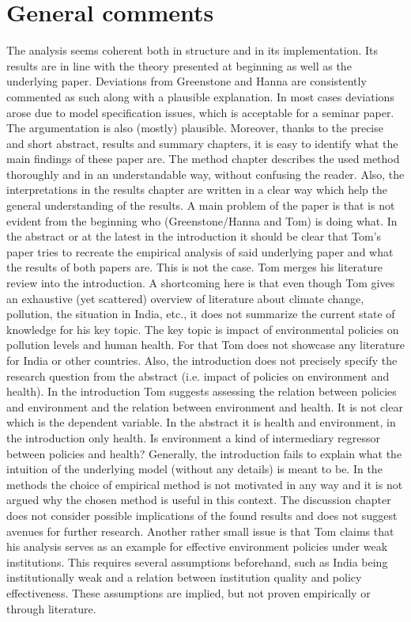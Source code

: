 \documentclass[11pt]{article}
\begin{document}
\section{General comments}
The analysis seems coherent both in structure and in its implementation. Its results are in line with the theory presented at beginning as well as the underlying paper. Deviations from Greenstone and Hanna are consistently commented as such along with a plausible explanation. In most cases deviations arose due to model specification issues, which is acceptable for a seminar paper. The argumentation is also (mostly) plausible. 
Moreover, thanks to the precise and short abstract, results and summary chapters, it is easy to identify what the main findings of these paper are. The method chapter describes the used method thoroughly and in an understandable way, without confusing the reader. Also, the interpretations in the results chapter are written in a clear way which help the general understanding of the results. 
\newline A main problem of the paper is that is not evident from the beginning who (Greenstone/Hanna and Tom) is doing what. In the abstract or at the latest in the introduction it should be clear that Tom's paper tries to recreate the empirical analysis of said underlying paper and what the results of both papers are. This is not the case. 
Tom merges his literature review into the introduction. A shortcoming here is that even though Tom gives an exhaustive (yet scattered) overview of literature about climate change, pollution, the situation in India, etc., it does not summarize the current state of knowledge for his key topic. The key topic is impact of environmental policies on pollution levels and human health. For that Tom does not showcase any literature for India or other countries. 
Also, the introduction does not precisely specify the research question from the abstract (i.e. impact of policies on environment and health). In the introduction Tom suggests assessing the relation between policies and environment and the relation between environment and health. It is not clear which is the dependent variable. In the abstract it is health and environment, in the introduction only health. Is environment a kind of intermediary regressor between policies and health? Generally, the introduction fails to explain what the intuition of the underlying model (without any details) is meant to be. 
In the methods the choice of empirical method is not motivated in any way and it is not argued why the chosen method is useful in this context. The discussion chapter does not consider possible implications of the found results and does not suggest avenues for further research.
Another rather small issue is that Tom claims that his analysis serves as an example for effective environment policies under weak institutions. This requires several assumptions beforehand, such as India being institutionally weak and a relation between institution quality and policy effectiveness. These assumptions are implied, but not proven empirically or through literature.
\end{document}
